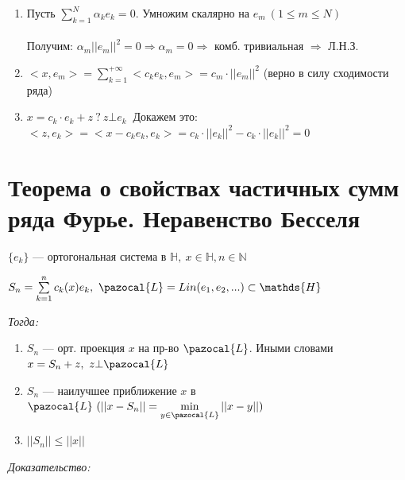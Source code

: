 \documentclass[paper=a4, fontsize=17pt]{article}
\begin{document}
\begin{enumerate}

	\item Пусть $\sum\limits_{k=1}^{N} \alpha_k e_k = 0$. Умножим скалярно на $e_m\ (1 \leqslant m \leqslant N)$\\ \\
	Получим: $\alpha_m ||e_m||^2 = 0 \Rightarrow \alpha_m = 0 \Rightarrow$ комб. тривиальная $\Rightarrow$ Л.Н.З.

	\item $<x, e_m> = \sum\limits_{k=1}^{+\infty} <c_k e_k, e_m> = c_m \cdot ||e_m||^2$ (верно в силу сходимости ряда)

	\item $x = c_k \cdot e_k + z\ ?\ z \bot e_k\ $ Докажем это:\\
	$<z, e_k> = <x - c_k e_k, e_k> = c_k \cdot ||e_k||^2 - c_k\cdot ||e_k||^2 = 0$

\end{enumerate}

\section{Теорема о свойствах частичных сумм ряда Фурье. Неравенство Бесселя}

$\{e_k\}$ {{---}} ортогональная система в $\mathds{H},\ x \in \mathds{H}, n \in \mathbb{N}$

$S_n = \sum\limits_{k=1}^{n} c_k(x)e_k,\ \pazocal{L} = Lin(e_1, e_2, ...) \subset \mathds{H}$

\emph{Тогда:}

\begin{enumerate}

	\item $S_n$ {{---}} орт. проекция $x$ на пр-во $\pazocal{L}$. Иными словами $x = S_n + z,\ z \bot \pazocal{L}$

	\item $S_n$ {{---}} наилучшее приближение $x$ в $\pazocal{L}\ (||x - S_n|| = \min\limits_{y \in \pazocal{L}} ||x - y||)$

	\item $||S_n|| \leqslant ||x||$

\end{enumerate}

\emph{Доказательство:}
\end{document}
